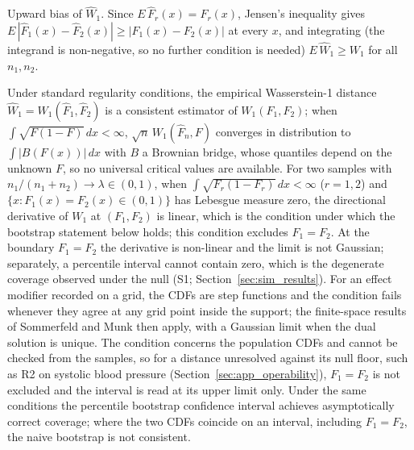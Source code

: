 \documentclass[AMA,Times1COL]{WileyNJDv5}
\begin{document}

Upward bias of $\widehat{W}_1$. Since $E\,\hat{F}_r(x) = F_r(x)$, Jensen's inequality gives $E\,|\hat{F}_1(x) - \hat{F}_2(x)| \geq |F_1(x) - F_2(x)|$ at every $x$, and integrating (the integrand is non-negative, so no further condition is needed) $E\,\widehat{W}_1 \geq W_1$ for all $n_1, n_2$.

Under standard regularity conditions, the empirical Wasserstein-1 distance $\widehat{W}_1 = W_1(\hat{F}_1, \hat{F}_2)$ is a consistent estimator of $W_1(F_1, F_2)$; when $\int \sqrt{F(1-F)}\,dx < \infty$, $\sqrt{n}\,W_1(\hat{F}_n, F)$ converges in distribution to $\int |B(F(x))|\,dx$ with $B$ a Brownian bridge,\cite{delbarrio1999} whose quantiles depend on the unknown $F$, so no universal critical values are available. For two samples with $n_1/(n_1+n_2) \to \lambda \in (0,1)$, when $\int \sqrt{F_r(1-F_r)}\,dx < \infty$ ($r = 1, 2$) and $\{x : F_1(x) = F_2(x) \in (0,1)\}$ has Lebesgue measure zero, the directional derivative of $W_1$ at $(F_1, F_2)$ is linear, which is the condition under which the bootstrap statement below holds;\cite{fang2019} this condition excludes $F_1 = F_2$. At the boundary $F_1 = F_2$ the derivative is non-linear and the limit is not Gaussian; separately, a percentile interval cannot contain zero, which is the degenerate coverage observed under the null (S1; Section~\ref{sec:sim_results}). For an effect modifier recorded on a grid, the CDFs are step functions and the condition fails whenever they agree at any grid point inside the support; the finite-space results of Sommerfeld and Munk then apply,\cite{sommerfeld2018} with a Gaussian limit when the dual solution is unique. The condition concerns the population CDFs and cannot be checked from the samples, so for a distance unresolved against its null floor, such as R2 on systolic blood pressure (Section~\ref{sec:app_operability}), $F_1 = F_2$ is not excluded and the interval is read at its upper limit only. Under the same conditions the percentile bootstrap confidence interval achieves asymptotically correct coverage;\cite{fang2019} where the two CDFs coincide on an interval, including $F_1 = F_2$, the naive bootstrap is not consistent.\cite{dumbgen1993,fang2019}

\end{document}
